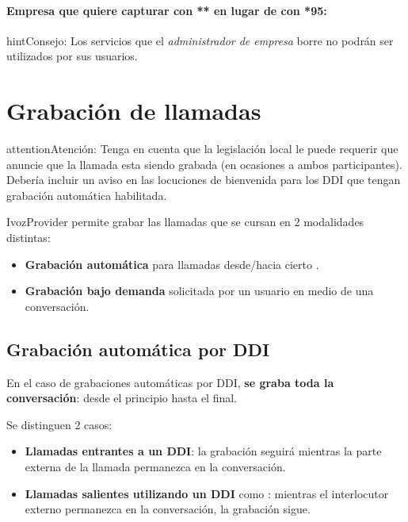 \documentclass[letterpaper,10pt,spanish]{sphinxmanual}
\begin{document}
\paragraph{Empresa que quiere capturar con ** en lugar de con *95:}

\noindent{}

\begin{notice}{hint}{Consejo:}
Los servicios que el \emph{administrador de empresa} borre no podrán ser utilizados por sus usuarios.
\end{notice}


\section{Grabación de llamadas}
\label{pbx_features/call_recording:call-recording}\label{pbx_features/call_recording::doc}\label{pbx_features/call_recording:call-recordings}
\begin{notice}{attention}{Atención:}
Tenga en cuenta que la legislación local le puede requerir que anuncie que la llamada esta siendo grabada (en ocasiones a ambos participantes). Debería incluir un aviso en las locuciones de bienvenida para los DDI que tengan grabación automática habilitada.
\end{notice}

IvozProvider permite grabar las llamadas que se cursan en 2 modalidades distintas:
\begin{itemize}
\item {} 
\textbf{Grabación automática} para llamadas desde/hacia cierto {\hyperref[pbx_features/external_ddis:external\string-ddis]{}}.

\item {} 
\textbf{Grabación bajo demanda} solicitada por un usuario en medio de una conversación.

\end{itemize}


\subsection{Grabación automática por DDI}
\label{pbx_features/call_recording:automatic-ddi-recordings}
En el caso de grabaciones automáticas por DDI, \textbf{se graba toda la conversación}: desde el principio hasta el final.

Se distinguen 2 casos:
\begin{itemize}
\item {} 
\textbf{Llamadas entrantes a un DDI}: la grabación seguirá mientras la parte externa de la llamada permanezca en la conversación.

\item {} 
\textbf{Llamadas salientes utilizando un DDI} como {\hyperref[pbx_features/external_ddis:external\string-ddis]{}}: mientras el interlocutor externo permanezca en la conversación, la grabación sigue.

\end{itemize}
\end{document}
